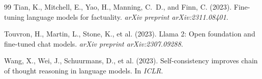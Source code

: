 \documentclass[11pt,a4paper]{article}
\begin{document}
\begin{thebibliography}{99}
Tian, K., Mitchell, E., Yao, H., Manning, C.~D., and Finn, C. (2023).
\newblock Fine-tuning language models for factuality.
\newblock \emph{arXiv preprint arXiv:2311.08401}.

Touvron, H., Martin, L., Stone, K., et al. (2023).
\newblock Llama 2: Open foundation and fine-tuned chat models.
\newblock \emph{arXiv preprint arXiv:2307.09288}.

Wang, X., Wei, J., Schuurmans, D., et al. (2023).
\newblock Self-consistency improves chain of thought reasoning in language models.
\newblock In \emph{ICLR}.

\end{thebibliography}
\end{document}
